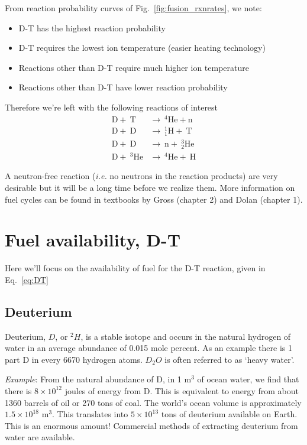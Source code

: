 \documentclass[11pt]{report} %
\begin{document}
From reaction probability curves of Fig.~\ref{fig:fusion_rxnrates}, we note:
\begin{itemize}
\item D-T has the highest reaction probability
\item D-T requires the lowest ion temperature (easier heating technology)
\item Reactions other than D-T require much higher ion temperature
\item Reactions other than D-T have lower reaction probability
\end{itemize}


Therefore we're left with the following reactions of interest
\begin{align}
\mathrm{D} +~\mathrm{T}&\xrightarrow{}~^4\mathrm{He}+\mathrm{n}\\
\mathrm{D} +~\mathrm{D}&\xrightarrow{}~_1^1\mathrm{H}+~\mathrm{T}\\
\mathrm{D} +~\mathrm{D}&\xrightarrow{}~\mathrm{n}+~^3_2\mathrm{He}\\
\mathrm{D} +~^3\mathrm{He}&\xrightarrow{}~^4\mathrm{He}+~\mathrm{H}
\end{align}

A neutron-free reaction ({\it i.e.} no neutrons in the reaction products) are very desirable but it will be a long time before we realize them. More information on fuel cycles can be found in textbooks by Gross (chapter 2) and Dolan (chapter 1).

\section{Fuel availability, D-T}
Here we'll focus on the availability of fuel for the D-T reaction, given in Eq.~\ref{eq:DT}

\subsection{Deuterium}
Deuterium, $D$, or $^2H$, is a stable isotope and occurs in the natural hydrogen of water in an average abundance of 0.015 mole percent. As an example there is 1 part D in every 6670 hydrogen atoms.  $D_2O$ is often referred to as `heavy water'.

{\it Example}: From the natural abundance of D, in 1 m$^3$ of ocean water, we find that there is $8\times 10^{12}$ joules of energy from D. This is equivalent to energy from about 1360 barrels of oil or 270 tons of coal. The world's ocean volume is approximately $1.5\times 10^{18}$ m$^3$. This translates into $5\times 10^{13} $ tons of deuterium available on Earth. This is an enormous amount! Commercial methods of extracting deuterium from water are available.
\end{document}
